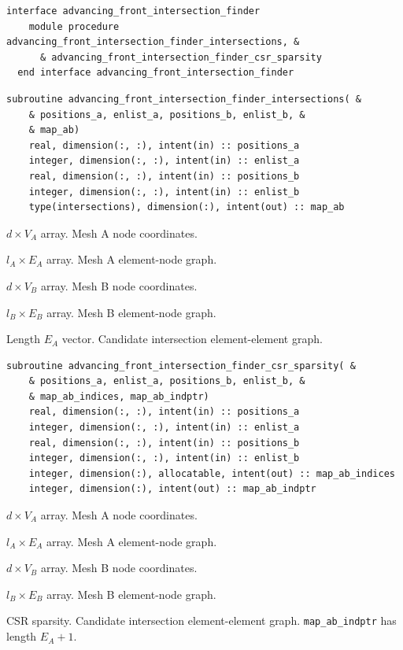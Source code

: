 \documentclass{article}
\begin{document}
\begin{lstlisting}[language=FORTRAN]
  interface advancing_front_intersection_finder
    module procedure advancing_front_intersection_finder_intersections, &
      & advancing_front_intersection_finder_csr_sparsity
  end interface advancing_front_intersection_finder
\end{lstlisting}

\begin{lstlisting}[language=FORTRAN]
  subroutine advancing_front_intersection_finder_intersections( &
    & positions_a, enlist_a, positions_b, enlist_b, &
    & map_ab)
    real, dimension(:, :), intent(in) :: positions_a
    integer, dimension(:, :), intent(in) :: enlist_a
    real, dimension(:, :), intent(in) :: positions_b
    integer, dimension(:, :), intent(in) :: enlist_b
    type(intersections), dimension(:), intent(out) :: map_ab
\end{lstlisting}

\begin{description}[font=\ttfamily\bfseries,leftmargin=2.2\parindent,labelindent=1.7\parindent,noitemsep]
  \item[positions\_a] $d \times V_A$ array. Mesh A node coordinates.
  \item[enlist\_a] $l_A \times E_A$ array. Mesh A element-node graph.
  \item[positions\_b] $d \times V_B$ array. Mesh B node coordinates.
  \item[enlist\_b] $l_B \times E_B$ array. Mesh B element-node graph.
  \item[map\_ab] Length $E_A$ vector. Candidate intersection element-element
    graph.
\end{description}

\begin{lstlisting}[language=FORTRAN]
  subroutine advancing_front_intersection_finder_csr_sparsity( &
    & positions_a, enlist_a, positions_b, enlist_b, &
    & map_ab_indices, map_ab_indptr)
    real, dimension(:, :), intent(in) :: positions_a
    integer, dimension(:, :), intent(in) :: enlist_a
    real, dimension(:, :), intent(in) :: positions_b
    integer, dimension(:, :), intent(in) :: enlist_b
    integer, dimension(:), allocatable, intent(out) :: map_ab_indices
    integer, dimension(:), intent(out) :: map_ab_indptr
\end{lstlisting}

\begin{description}[font=\ttfamily\bfseries,leftmargin=2.2\parindent,labelindent=1.7\parindent,noitemsep]
  \item[positions\_a] $d \times V_A$ array. Mesh A node coordinates.
  \item[enlist\_a] $l_A \times E_A$ array. Mesh A element-node graph.
  \item[positions\_b] $d \times V_B$ array. Mesh B node coordinates.
  \item[enlist\_b] $l_B \times E_B$ array. Mesh B element-node graph.
  \item[map\_ab\_indices, map\_ab\_indptr] CSR sparsity. Candidate intersection
    element-element graph. \linebreak \verb+map_ab_indptr+ has length $E_A + 1$.
\end{description}
\end{document}
